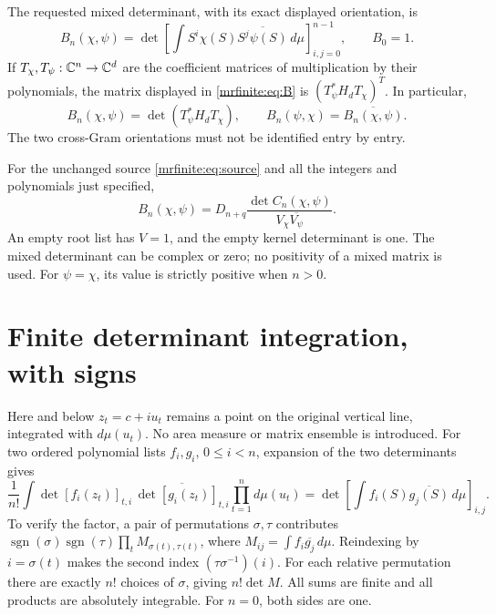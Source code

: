 \documentclass[11pt]{article}
\begin{document}
The requested mixed determinant, with its exact displayed orientation,
is
\begin{equation}\label{mrfinite:eq:B}
 B_n(\chi,\psi)=
 \det\left[\int S^i\chi(S)\overline{S^j\psi(S)}\,d\mu\right]_{i,j=0}^{n-1},
 \qquad B_0=1.
\end{equation}
If \(T_\chi,T_\psi:\mathbb C^n\to\mathbb C^d\) are the coefficient matrices of
multiplication by their polynomials, the matrix displayed in
\eqref{mrfinite:eq:B} is \((T_\psi^*H_dT_\chi)^T\). In particular,
\begin{equation}\label{mrfinite:eq:B-orientation}
 B_n(\chi,\psi)=\det(T_\psi^*H_dT_\chi),\qquad
 B_n(\psi,\chi)=\overline{B_n(\chi,\psi)}.
\end{equation}
The two cross-Gram orientations must not be identified entry by entry.

\begin{mrfinitetheorem}\label{mrfinite:thm:mixed}
For the unchanged source \eqref{mrfinite:eq:source} and all the integers and
polynomials just specified,
\begin{equation}\label{mrfinite:eq:main}
 \boxed{B_n(\chi,\psi)
   =D_{n+q}\frac{\det C_n(\chi,\psi)}{V_\chi\overline{V_\psi}}.}
\end{equation}
An empty root list has \(V=1\), and the empty kernel determinant is one.
The mixed determinant can be complex or zero; no positivity of a mixed
matrix is used. For \(\psi=\chi\), its value is strictly positive when
\(n>0\).
\end{mrfinitetheorem}

\section{Finite determinant integration, with signs}\label{mrfinite:sec:integration}

Here and below \(z_t=c+iu_t\) remains a point on the original vertical
line, integrated with \(d\mu(u_t)\). No area measure or matrix ensemble
is introduced. For two ordered polynomial lists \(f_i,g_i\),
\(0\leq i<n\), expansion of the two determinants gives
\begin{equation}\label{mrfinite:eq:andreief}
 \frac1{n!}\int
 \det[f_i(z_t)]_{t,i}\,
 \overline{\det[g_i(z_t)]_{t,i}}
 \prod_{t=1}^n d\mu(u_t)
  =\det\left[\int f_i(S)\overline{g_j(S)}\,d\mu\right]_{i,j}.
\end{equation}
To verify the factor, a pair of permutations \(\sigma,\tau\) contributes
\(\operatorname{sgn}(\sigma)\operatorname{sgn}(\tau)
\prod_t M_{\sigma(t),\tau(t)}\), where
\(M_{ij}=\int f_i\overline{g_j}\,d\mu\).
Reindexing by \(i=\sigma(t)\) makes the second index
\((\tau\sigma^{-1})(i)\). For each relative permutation there are
exactly \(n!\) choices of \(\sigma\), giving \(n!\det M\).
All sums are finite and all products are absolutely integrable.
For \(n=0\), both sides are one.
\end{document}
